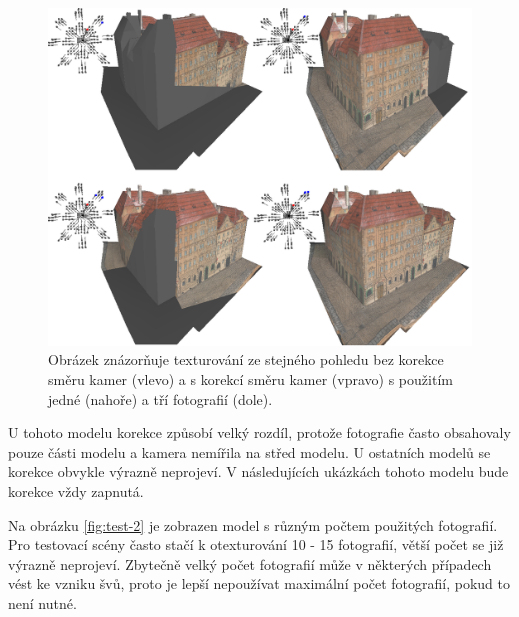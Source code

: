 \documentclass[11pt,twoside,a4paper]{book}
\begin{document}
\begin{figure}[h!]
\begin{center}
\includegraphics[width=\textwidth]{figures/test-1}
\caption{Obrázek znázorňuje texturování ze stejného pohledu bez korekce směru kamer (vlevo) a s korekcí směru kamer (vpravo) s použitím jedné (nahoře) a tří fotografií (dole).}
\label{fig:test-1}
\end{center}
\end{figure}

U tohoto modelu korekce způsobí velký rozdíl, protože fotografie často obsahovaly pouze části modelu a kamera nemířila na střed modelu. U ostatních modelů se korekce obvykle výrazně neprojeví. V následujících ukázkách tohoto modelu bude korekce vždy zapnutá.

Na obrázku \ref{fig:test-2} je zobrazen model s různým počtem použitých fotografií. Pro testovací scény často stačí k otexturování 10 - 15 fotografií, větší počet se již výrazně neprojeví. Zbytečně velký počet fotografií může v některých případech vést ke vzniku švů, proto je lepší nepoužívat maximální počet fotografií, pokud to není nutné.
\end{document}
